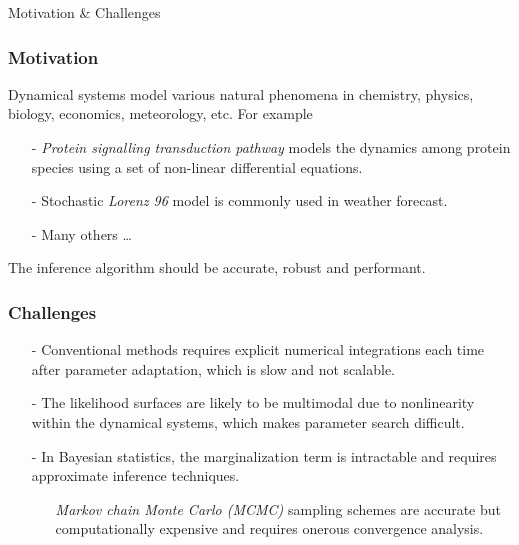 \begin{frame}
    \begin{center}
        {\large Motivation \& Challenges}
    \end{center}        
\end{frame}

\begin{frame}[t]
    \frametitle{Motivation}
    Dynamical systems model various natural phenomena in chemistry, physics, biology, economics, meteorology, etc. For example
    \begin{itemize}
        \item[-] \emph{Protein signalling transduction pathway} models the dynamics among protein species using a set of non-linear differential equations.
        \item[-] Stochastic \emph{Lorenz 96} model is commonly used in weather forecast.
        \item[-] Many others \dots
    \end{itemize}

    \vspace{\baselineskip}    
    The inference algorithm should be accurate, robust and performant.
\end{frame}

\begin{frame}[t]
    \frametitle{Challenges}
    \begin{itemize}
        \item[-] Conventional methods requires explicit numerical integrations each time after parameter adaptation, which is slow and not scalable.
        \item[-] The likelihood surfaces are likely to be multimodal due to nonlinearity within the dynamical systems, which makes parameter search difficult.
        \item[-] In Bayesian statistics, the marginalization term is intractable and requires approximate inference techniques.
        \begin{itemize}
            \item[] \emph{Markov chain Monte Carlo (MCMC)} sampling schemes are accurate but computationally expensive and requires onerous convergence analysis.
        \end{itemize}         
    \end{itemize}
\end{frame}
